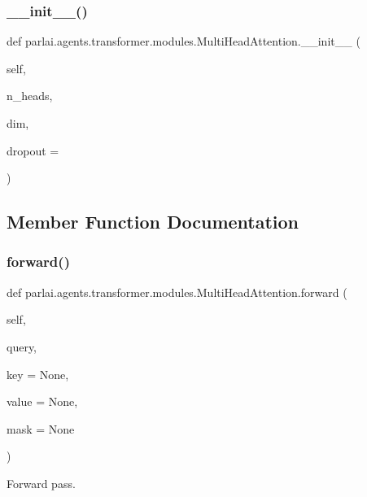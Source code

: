 \subsubsection{\texorpdfstring{\+\_\+\+\_\+init\+\_\+\+\_\+()}{\_\_init\_\_()}}
{\footnotesize\ttfamily def parlai.\+agents.\+transformer.\+modules.\+Multi\+Head\+Attention.\+\_\+\+\_\+init\+\_\+\+\_\+ (\begin{DoxyParamCaption}\item[{}]{self,  }\item[{}]{n\+\_\+heads,  }\item[{}]{dim,  }\item[{}]{dropout = {} }\end{DoxyParamCaption})}



\subsection{Member Function Documentation}
\mbox{\label{classparlai_1_1agents_1_1transformer_1_1modules_1_1MultiHeadAttention_a0685acda3d791bccfb9a6f4ff2c3680f}} 
\subsubsection{\texorpdfstring{forward()}{forward()}}
{\footnotesize\ttfamily def parlai.\+agents.\+transformer.\+modules.\+Multi\+Head\+Attention.\+forward (\begin{DoxyParamCaption}\item[{}]{self,  }\item[{}]{query,  }\item[{}]{key = {\ttfamily None},  }\item[{}]{value = {\ttfamily None},  }\item[{}]{mask = {\ttfamily None} }\end{DoxyParamCaption})}

\begin{DoxyVerb}Forward pass.
\end{DoxyVerb}
 

